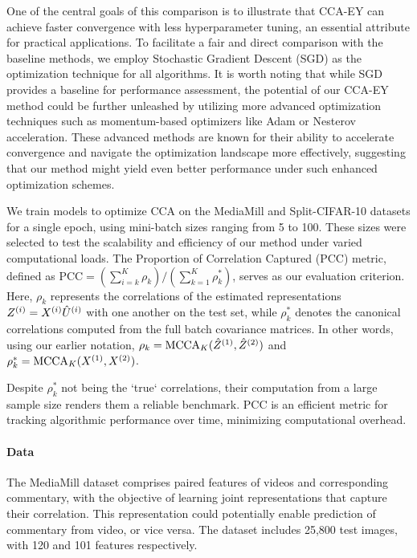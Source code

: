One of the central goals of this comparison is to illustrate that CCA-EY can achieve faster convergence with less hyperparameter tuning, an essential attribute for practical applications.
To facilitate a fair and direct comparison with the baseline methods, we employ Stochastic Gradient Descent (SGD) as the optimization technique for all algorithms.
It is worth noting that while SGD provides a baseline for performance assessment, the potential of our CCA-EY method could be further unleashed by utilizing more advanced optimization techniques such as momentum-based optimizers like Adam or Nesterov acceleration.
These advanced methods are known for their ability to accelerate convergence and navigate the optimization landscape more effectively, suggesting that our method might yield even better performance under such enhanced optimization schemes.

We train models to optimize CCA on the MediaMill and Split-CIFAR-10 datasets for a single epoch, using mini-batch sizes ranging from 5 to 100.
These sizes were selected to test the scalability and efficiency of our method under varied computational loads. The Proportion of Correlation Captured (PCC) metric, defined as \( \text{PCC} = (\sum_{i=k}^K \rho_k)/ ({\sum_{k=1}^K \rho_k^*}) \), serves as our evaluation criterion.
Here, $\rho_k$ represents the correlations of the estimated representations $Z^{(i)}=X^{(i)}\hat{U}^{(i)}$ with one another on the test set, while $\rho_k^*$ denotes the canonical correlations computed from the full batch covariance matrices.
In other words, using our earlier notation, $\rho_k = \operatorname{MCCA}_K(\hat{Z}^{(1)}, \hat{Z}^{(2)})$ and $\rho_k^* = \operatorname{MCCA}_K(X^{(1)}, X^{(2)})$.

Despite $\rho_k^*$ not being the `true` correlations, their computation from a large sample size renders them a reliable benchmark.
PCC is an efficient metric for tracking algorithmic performance over time, minimizing computational overhead\citep{meng2021online, gemp2022generalized, ma2015finding, ge2016efficient}.

\paragraph{Data}
The MediaMill dataset \citep{gemert2008visual} comprises paired features of videos and corresponding commentary, with the objective of learning joint representations that capture their correlation.
This representation could potentially enable prediction of commentary from video, or vice versa.
The dataset includes 25,800 test images, with 120 and 101 features respectively.

